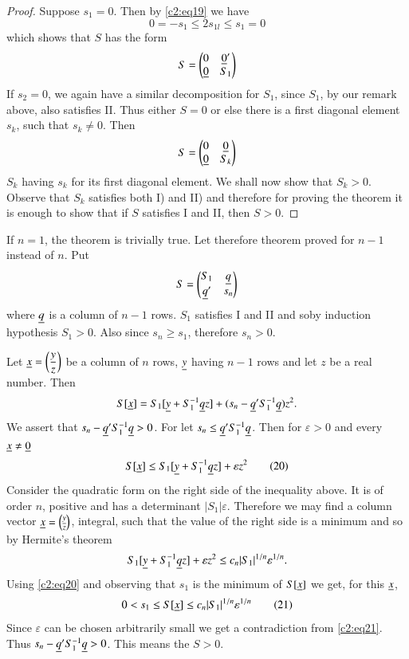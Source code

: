 \begin{proof}
Suppose $s_{1}=0$. Then by \eqref{c2:eq19} we have
$$
0=-s_{1}\leq 2s_{1l}\leq s_1 = 0
$$
which shows that $S$ has the form
$$
S=
\begin{pmatrix}
0 & \underline{0}'\\
\underline{0} & S_{1}
\end{pmatrix}
$$
If $s_{2}=0$, we again have a similar decomposition for $S_{1}$, since
$S_{1}$, by our remark above, also satisfies II. Thus either $S=0$ or
else there is a first diagonal element $s_{k}$, such that $s_{k}\neq
0$. Then 
$$
S=
\begin{pmatrix}
0 & \underline{0}\\
\underline{0} & S_{k}
\end{pmatrix}
$$
$S_{k}$ having $s_{k}$ for its first diagonal element. We shall now
show that $S_{k}>0$. Observe that $S_{k}$ satisfies both I) and II)
and therefore for proving the theorem it is enough to show that if $S$
satisfies I and II, then $S>0$. 
\end{proof}

If $n=1$, the theorem is trivially true. Let therefore theorem proved
for $n-1$ instead of $n$. Put
$$
S=
\begin{pmatrix}
S_{1} & \underline{q}\\
\underline{q}' & s_{n}
\end{pmatrix}
$$
where $\underline{q}$ is a column of $n-1$ rows. $S_{1}$ satisfies I and II
and so\pageoriginale by induction hypothesis $S_{1}>0$. Also since
$s_{n}\geq s_{1}$, therefore $s_{n}>0$.

Let $\underline{x}=\left(\dfrac{y}{z}\right)$ be a column of $n$ rows,
$\underline{y}$ having $n-1$ rows and let $z$ be a real number. Then
$$
S[\underline{x}]=S_{1}[\underline{y}+S^{-1}_{1}\underline{q}z]+(s_{n}-\underline{q}'S^{-1}_{1}\underline{q})z^{2}.
$$
We assert that $s_{n}-\underline{q}'S^{-1}_{1}\underline{q}>0$. For let $s_{n}\leq
\underline{q}'S^{-1}_{1}\underline{q}$. Then for $\varepsilon>0$ and every $\underline{x}\neq
\underline{0}$
\begin{equation*}
S[\underline{x}]\leq S_{1}[\underline{y}+S^{-1}_{1}\underline{q}z]+\varepsilon z^{2}\tag{20}\label{c2:eq20}
\end{equation*}
Consider the quadratic form on the right side of the inequality
above. It is of order $n$, positive and has a determinant
$|S_{1}|\varepsilon$. Therefore we may find a column vector
$\underline{x}=\binom{\underline{y}}{z}$, integral, such that the value of the right
side is a minimum and so by Hermite's theorem
$$
S_{1}[\underline{y}+S^{-1}_{1}\underline{q}z]+\varepsilon z^{2}\leq
c_{n}|S_{1}|^{1/n}\varepsilon^{1/n}. 
$$
Using \eqref{c2:eq20} and observing that $s_{1}$ is the minimum of
$S[\underline{x}]$ we get, for this $\underline{x}$,
\begin{equation*}
0<s_{1}\leq S[\underline{x}]\leq c_{n}|S_{1}|^{1/n}\varepsilon^{1/n}\tag{21}\label{c2:eq21}
\end{equation*}
Since $\varepsilon$ can be chosen arbitrarily small we get a
contradiction from \eqref{c2:eq21}. Thus
$s_{n}-\underline{q}'S^{-1}_{1}\underline{q}>0$. This means the $S>0$.

